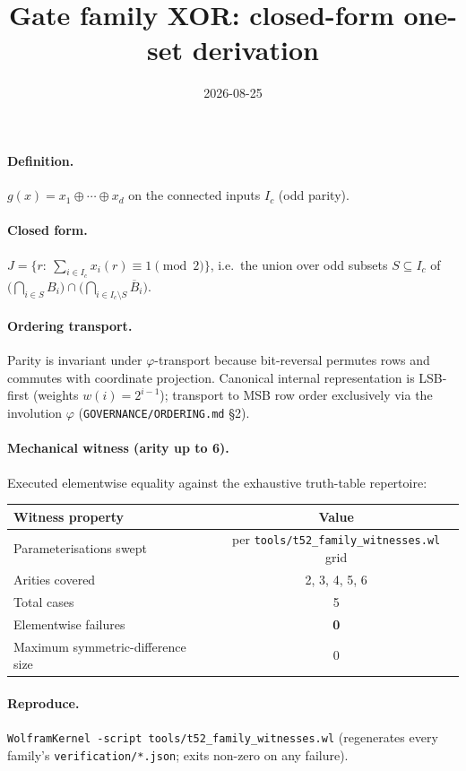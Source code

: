 \documentclass{article}
\title{Gate family XOR: closed-form one-set derivation}
\date{2026-08-25}
\begin{document}
\maketitle

\paragraph{Definition.} $g(x)=x_1\oplus\cdots\oplus x_d$ on the connected inputs $I_c$ (odd parity).

\paragraph{Closed form.} $J=\{r:\ \sum_{i\in I_c} x_i(r)\equiv 1 \pmod 2\}$, i.e.\ the union over odd subsets $S\subseteq I_c$ of $\bigl(\bigcap_{i\in S}B_i\bigr)\cap\bigl(\bigcap_{i\in I_c\setminus S}\overline{B}_i\bigr)$.

\paragraph{Ordering transport.} Parity is invariant under $\varphi$-transport because bit-reversal permutes rows and commutes with coordinate projection.
Canonical internal representation is LSB-first (weights $w(i)=2^{i-1}$);
transport to MSB row order exclusively via the involution $\varphi$
(\texttt{GOVERNANCE/ORDERING.md} \S2).

\paragraph{Mechanical witness (arity up to 6).} Executed elementwise equality
against the exhaustive truth-table repertoire:
\begin{center}
\begin{tabular}{lc}
\hline
Witness property & Value \\ \hline
Parameterisations swept & per \texttt{tools/t52_family_witnesses.wl} grid \\
Arities covered & 2, 3, 4, 5, 6 \\
Total cases & 5 \\
Elementwise failures & \textbf{0} \\
Maximum symmetric-difference size & 0 \\ \hline
\end{tabular}
\end{center}

\paragraph{Reproduce.} \texttt{WolframKernel -script tools/t52_family_witnesses.wl}
(regenerates every family's \texttt{verification/*.json}; exits non-zero on any failure).
\end{document}
